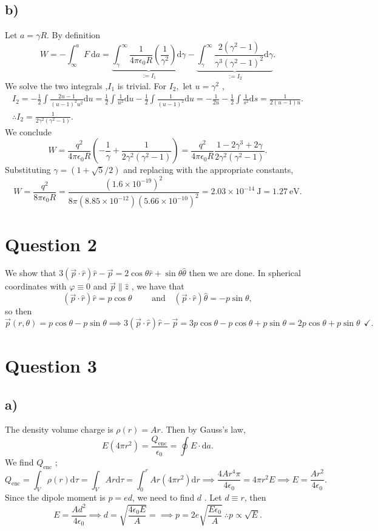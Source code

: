 \documentclass[12pt]{article}
\newcommand{\ep}{\epsilon}
\newcommand{\dr}{\mathrm{d}}
\theoremstyle{definition}
\theoremstyle{definition}
\theoremstyle{definition}
\theoremstyle{definition}
\theoremstyle{definition}
\theoremstyle{example}
\theoremstyle{note}
\theoremstyle{remark}
\theoremstyle{example}
\begin{document}
		\subsection*{b)}
			Let $a = \gamma R$. By definition 
			$$ W = - \int_{\infty}^{a} F\ \dr a  = \underbrace{\int_{\gamma}^{\infty} \frac{1}{4 \pi \ep_{0} R } \left(\frac{1}{\gamma^{2}}\right) \dr \gamma}_{:= I_{1}} - \underbrace{\int_{\gamma}^{\infty} \frac{2 (\gamma^{2} -1)}{\gamma^{3} (\gamma^{2} -1)^{2}} \dr \gamma}_{:= I_{2}}.$$
			We solve the two integrals ,$I_{1}$ is trivial. For $I_{2},$ let $u = \gamma^{2}$ , 
			\begin{gather*}
				I_{2} = -\frac12 \int \frac{2u-1}{(u-1)^{2} u^{2}} \dr u = \frac12 \int \frac{1}{u^{2}} \dr u - \frac12 \int \frac{1}{(u-1)^{2}} \dr u = -\frac{1}{2u} - \frac12 \int \frac{1}{s^{2}} \dr s = \frac{1}{2(u-1)u}.\\
				\therefore I_{2} = \frac{1}{2\gamma^{2} (\gamma^{2} -1)}.
			\end{gather*}
			We conclude 
			$$ W = \frac{q^{2}}{4 \pi \ep_{0}R}\left( - \frac{1}{\gamma } + \frac{1}{2\gamma^{2} (\gamma^{2} -1)}\right) = \frac{q^{2}}{4\pi \ep_{0} R} \frac{1-2\gamma^{3} + 2\gamma}{2\gamma^{2} (\gamma^{2} -1)}.$$
			Substituting $\gamma = (1+\sqrt{5} / 2)$ and replacing with the appropriate constants, 
			$$ W = \frac{q^{2}}{8 \pi \ep_{0} R} = \frac{(1.6 \times 10^{-19})^{2} }{8 \pi (8.85 \times 10^{-12}) (5.66 \times 10^{-10})^{2}} = 2.03 \times 10^{-14} \ \si{\joule} = 1.27 \ \si{\electronvolt}.$$
		\section*{Question 2}
			We show that $3(\vec{p} \cdot \hat{r}) \hat{r} - \vec{p} = 2 \cos\theta \hat{r} + \sin \theta \hat{\theta}$ then we are done. In spherical coordinates with $\varphi \equiv 0$ and $\vec{p } \parallel \hat{z}$ , we have that 
			$$ (\vec{p} \cdot \hat{r} )\hat{r} = p \cos\theta \qquad \text{ and } \ \ \ (\vec{p} \cdot \hat{r}) \hat{\theta} = - p \sin\theta,$$
			so then 
			$$ \vec{p}(r,\theta) = p\cos \theta - p\sin \theta \implies 3(\vec{p } \cdot \hat{r})\hat{r} - \vec{p} = 3p \cos\theta - p\cos\theta + p\sin \theta = 2p\cos\theta + p\sin \theta \ \ \checkmark. $$
		\section*{Question 3}
			\subsection*{a) }
				The density volume charge is $\rho(r) = Ar$. Then by Gauss's law, 
				$$ E(4 \pi r^{2}) = \frac{Q_{\text{enc}}}{\ep_{0}} = \oint E \cdot \dr a.$$
				We find $Q_{\text{enc}}$ ; 
				$$ Q_{\text{enc}} = \int_{V} \rho(r) \dr \tau = \int_{V} Ar \dr \tau = \int_{0}^{r} Ar (4\pi r^{2}) \dr r \implies \frac{4 Ar^{4} \pi}{4 \ep_{0}} = 4\pi r^{2} E \implies E = \frac{Ar^{2} }{4 \ep_{0}}.$$
				Since the dipole moment is $p = ed$, we need to find $d$ . Let $d\equiv r$, then 
				$$ E = \frac{Ad^{2}}{4 \ep_{0}} \implies d = \sqrt{\frac{4 \ep_{0} E }{A}} =\implies p = 2e \sqrt{\frac{E \ep_{0}}{A}} \ \therefore p \propto \sqrt{E}.$$
\end{document}
